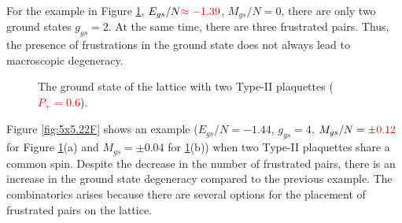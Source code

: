 \documentclass[preprint,12pt]{elsarticle}
\begin{document}
	For the example in Figure \ref{fig:4x7}, $E_{gs}/N\textcolor{red}{\approx-1.39}$, $M_{gs}/N=0$, there are only two ground states $g_{gs}=2$. At the same time, there are three frustrated pairs. Thus, the presence of frustrations in the ground state does not always lead to macroscopic degeneracy. 
	
	\begin{figure}[H]
		\centering
		\caption{The ground state of the lattice with two Type-II plaquettes (\textcolor{red}{  $P_+=0.6$})\textcolor{red}{.}}
		\label{fig:4x7}
	\end{figure}
	
	Figure \ref{fig:5x5.22F} shows an example ($E_{gs}/N=-1.44$, $g_{gs}=4$, $M_{gs}/N=\pm \textcolor{red}{0.12}$ for Figure \ref{fig:4x7}(a) and $M_{gs}=\pm 0.04$ for \ref{fig:4x7}(b)) when two Type-II plaquettes share a common spin. Despite the decrease in the number of frustrated pairs, there is an increase in the ground state degeneracy compared to the previous example. The combinatorics arises because there are several options for the placement of frustrated pairs on the lattice.
	
\end{document}
